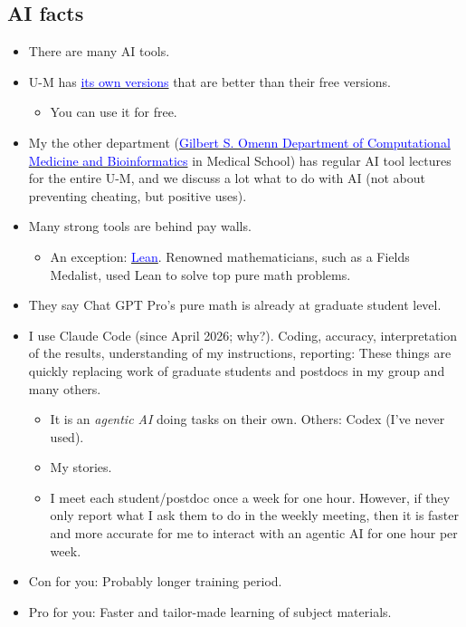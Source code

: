 \documentclass[20pt]{extarticle}
\newcommand{\hrefc}[2]{\href{#1}{\textcolor{blue}{#2}}}
\begin{document}
\subsection*{AI facts}

\begin{itemize}	
\item There are many AI tools.
\item U-M has \hrefc{https://genai.umich.edu/resources/tools}{its own versions} that are better than their free versions.
	\begin{itemize}
	\item You can use it for free.
	\end{itemize}
\item My the other department (\hrefc{https://medschool.umich.edu/departments/computational-medicine-bioinformatics}{Gilbert S. Omenn Department of Computational Medicine and Bioinformatics} in Medical School) has regular AI tool lectures for the entire U-M, and we discuss a lot what to do with AI (not about preventing cheating, but positive uses).	
\item Many strong tools are behind pay walls.
	\begin{itemize}
	\item An exception: \hrefc{https://en.wikipedia.org/wiki/Lean_(proof_assistant)}{Lean}. Renowned mathematicians, such as a Fields Medalist, used Lean to solve top pure math problems.
	\end{itemize}
\item They say Chat GPT Pro's pure math is already at graduate student level.
\item I use Claude Code (since April 2026; why?). Coding, accuracy, interpretation of the results, understanding of my instructions, reporting: These things are quickly replacing work of graduate students and postdocs in my group and many others.
	\begin{itemize}
	\item It is an \emph{agentic AI} doing tasks on their own. Others: Codex (I've never used).
	\item My stories.
	\item I meet each student/postdoc once a week for one hour. However, if they only report what I ask them to do in the weekly meeting, then it is faster and more accurate for me to interact with an agentic AI for one hour per week. 
	\end{itemize}
\item Con for you: Probably longer training period.
\item Pro for you: Faster and tailor-made learning of subject materials.
\end{itemize}
\end{document}
